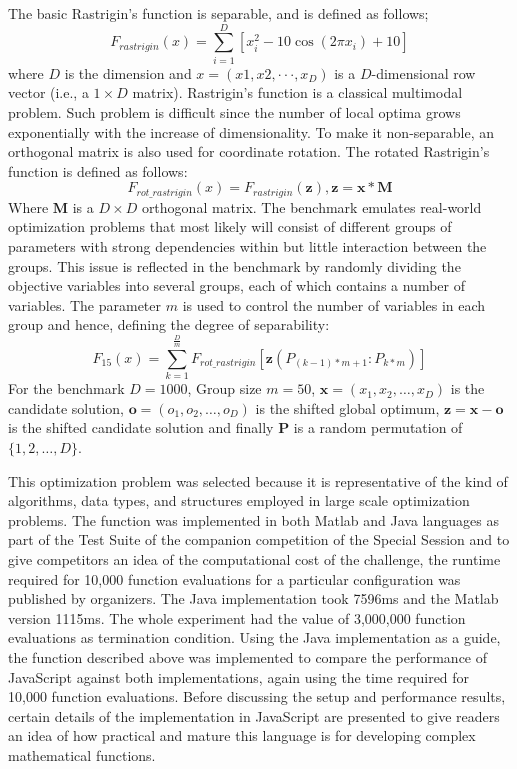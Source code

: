 \documentclass[journal,onecolumn]{IEEEtran}
\begin{document}
The basic Rastrigin's function is separable, and is defined as follows;
\begin{equation}
F_{rastrigin}(x)=\sum\limits_{i=1}^D [ x_{i}^{2}-10\cos(2\pi x_i)+10  ] 
\end{equation}
where $D$ is the dimension and $x = (x1, x2, · · · , x_{D})$ is a
$D$-dimensional row vector (i.e., a $1 × D$ matrix). Rastrigin’s function 
is a classical multimodal problem. Such problem is difficult since the number of local
optima grows exponentially with the increase of dimensionality. To make it 
non-separable, an orthogonal matrix is also used for coordinate rotation.
The rotated Rastrigin's function is defined as follows:
\begin{equation}
F_{rot\_rastrigin}(x)=F_{rastrigin}(\textbf{z}), \textbf{z}= \textbf{x} * \textbf{M}
\end{equation}
Where $\textbf{M}$ is  a $D \times{D}$ orthogonal matrix. The benchmark
emulates real-world optimization problems that most likely will consist 
of different groups of parameters with strong dependencies within
but little interaction between the groups. This issue is reflected in the benchmark 
by randomly dividing the objective variables
into several groups, each of which contains a number of variables. The parameter $m$ 
is used to control the number of variables in each group and hence, defining the degree
of separability:
\begin{equation}
F_{15}(x)=\sum\limits_{k=1}^\frac{D}{m}F_{rot\_rastrigin}[\textbf{z}(P_{(k-1)*m+1}:P_{k*m})] 
\end{equation}
For the benchmark $D = 1000$, Group size $m = 50$, $\textbf{x} = (x_1, x_2, \ldots , x_{D})$ is the
candidate solution, $\textbf{o} = (o_1, o_2, \ldots  , o_{D})$ is the shifted global optimum,
$\textbf{z} = \textbf{x} - \textbf{o}$ is the shifted candidate solution and
finally $\textbf{P}$ is a random permutation of $\lbrace1, 2, \ldots  ,D\rbrace$.

This optimization problem was selected because it is representative of the kind of
algorithms, data types, and structures employed in large scale optimization problems. 
The function was implemented in both Matlab and Java languages as part of the
Test Suite of the companion competition of the Special Session and to give competitors an idea of the
computational cost of the challenge, the runtime required for 10,000 function evaluations 
for a particular configuration was published by organizers. The Java
implementation took 7596ms and the Matlab version 1115ms. The whole experiment had the value of
3,000,000 function evaluations as termination condition. Using the Java implementation as
a guide, the function described above was implemented to compare the performance of JavaScript against
both implementations, again using the time required for 10,000 function evaluations. 
Before discussing the setup and performance results, certain details of
the implementation in JavaScript are presented to give readers an idea of 
how practical and mature this language is for developing complex mathematical functions.
\end{document}
